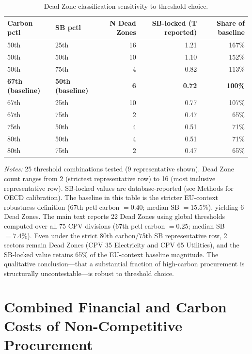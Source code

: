 \documentclass[11pt]{article}
\newcommand{\tabnoteblock}[1]{%
    \par\vspace{0.45em}%
    \begin{minipage}{0.98\linewidth}
    \footnotesize\raggedright #1
    \end{minipage}\par
}
\newcommand{\tabnotes}[1]{\tabnoteblock{\textit{Notes:} #1}}
\begin{document}
\begin{table}[H]
\centering
\caption{Dead Zone classification sensitivity to threshold choice.}
\label{tab:dz_sensitivity}
\scriptsize
\begin{tabular}{llrrr}
\toprule
\textbf{Carbon pctl} & \textbf{SB pctl} & \textbf{N Dead Zones} & \textbf{SB-locked (T reported)} & \textbf{Share of baseline} \\
\midrule
50th & 25th & 16 & 1.21 & 167\% \\
50th & 50th & 10 & 1.10 & 152\% \\
50th & 75th & 4 & 0.82 & 113\% \\
\midrule
\textbf{67th (baseline)} & \textbf{50th (baseline)} & \textbf{6} & \textbf{0.72} & \textbf{100\%} \\
67th & 25th & 10 & 0.77 & 107\% \\
67th & 75th & 2 & 0.47 & 65\% \\
\midrule
75th & 50th & 4 & 0.51 & 71\% \\
80th & 50th & 4 & 0.51 & 71\% \\
80th & 75th & 2 & 0.47 & 65\% \\
\bottomrule
\end{tabular}

\tabnotes{25 threshold combinations tested (9 representative shown). Dead Zone count ranges from 2 (strictest representative row) to 16 (most inclusive representative row). SB-locked values are database-reported (see Methods for OECD calibration). The baseline in this table is the stricter EU-context robustness definition (67th pctl carbon $= 0.40$; median SB $= 15.5\%$), yielding 6 Dead Zones. The main text reports 22 Dead Zones using global thresholds computed over all 75 CPV divisions (67th pctl carbon $= 0.25$; median SB $= 7.4\%$). Even under the strict 80th carbon/75th SB representative row, 2 sectors remain Dead Zones (CPV 35 Electricity and CPV 65 Utilities), and the SB-locked value retains 65\% of the EU-context baseline magnitude. The qualitative conclusion---that a substantial fraction of high-carbon procurement is structurally uncontestable---is robust to threshold choice.
}
\end{table}

\section{Combined Financial and Carbon Costs of Non-Competitive Procurement}
\end{document}
